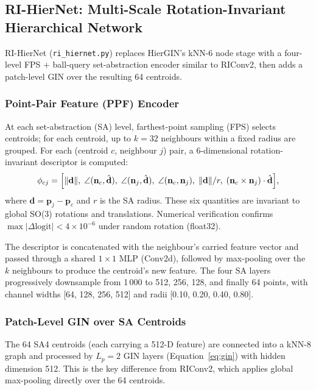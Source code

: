 \subsection{RI-HierNet: Multi-Scale Rotation-Invariant Hierarchical Network}
\label{sec:arch:rihiernet}

RI-HierNet (\texttt{ri\_hiernet.py}) replaces HierGIN's kNN-6 node stage with a
four-level FPS + ball-query set-abstraction encoder similar to RIConv2, then
adds a patch-level GIN over the resulting 64 centroids.

\subsubsection{Point-Pair Feature (PPF) Encoder}

At each set-abstraction (SA) level, farthest-point sampling (FPS) selects
centroids; for each centroid, up to $k = 32$ neighbours within a fixed radius
are grouped.
For each (centroid $c$, neighbour $j$) pair, a 6-dimensional rotation-invariant
descriptor is computed:
\begin{equation}
  \phi_{cj} = \Bigl[
    \|\mathbf{d}\|,\;
    \angle(\mathbf{n}_c, \hat{\mathbf{d}}),\;
    \angle(\mathbf{n}_j, \hat{\mathbf{d}}),\;
    \angle(\mathbf{n}_c, \mathbf{n}_j),\;
    \|\mathbf{d}\| / r,\;
    (\mathbf{n}_c \times \mathbf{n}_j) \cdot \hat{\mathbf{d}}
  \Bigr],
\end{equation}
where $\mathbf{d} = \mathbf{p}_j - \mathbf{p}_c$ and $r$ is the SA radius.
These six quantities are invariant to global SO(3) rotations and translations.
Numerical verification confirms $\max|\Delta\text{logit}| < 4 \times 10^{-6}$
under random rotation (float32).

The descriptor is concatenated with the neighbour's carried feature vector and
passed through a shared $1\times1$ MLP (Conv2d), followed by max-pooling over
the $k$ neighbours to produce the centroid's new feature.
The four SA layers progressively downsample from 1\,000 to 512, 256, 128, and
finally 64 points, with channel widths [64, 128, 256, 512] and radii
[0.10, 0.20, 0.40, 0.80].

\subsubsection{Patch-Level GIN over SA Centroids}

The 64 SA4 centroids (each carrying a 512-D feature) are connected into a
kNN-8 graph and processed by $L_p = 2$ GIN layers (Equation~\ref{eq:gin})
with hidden dimension 512.
This is the key difference from RIConv2, which applies global max-pooling
directly over the 64 centroids.

